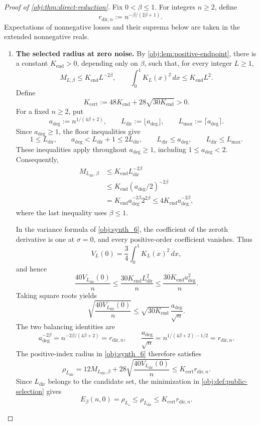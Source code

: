 \begin{proof}[Proof of \cref{obj:thm:direct-reduction}]
Fix \(0<\beta\le1\). For integers \(n\ge2\), define
\[
r_{\mathrm{dir},n}:=n^{-\beta/(2\beta+1)}.
\]
Expectations of nonnegative losses and their suprema below are taken in the extended nonnegative reals.

\begin{enumerate}
\item \textbf{The selected radius at zero noise.}
By \cref{obj:lem:positive-endpoint}, there is a constant \(K_{\mathrm{end}}>0\), depending only on \(\beta\), such that, for every integer \(L\ge1\),
\[
M_{L,\beta}\le K_{\mathrm{end}}L^{-2\beta},
\qquad
\int_0^1 K_L(x)^2\,dx\le K_{\mathrm{end}}L^2.
\]
Define
\[
K_{\mathrm{cert}}
:=48K_{\mathrm{end}}+28\sqrt{30K_{\mathrm{end}}}>0.
\]
For a fixed \(n\ge2\), put
\[
a_{\mathrm{deg}}:=n^{1/(4\beta+2)},
\qquad
L_{\mathrm{dir}}:=\lfloor a_{\mathrm{deg}}\rfloor,
\qquad
L_{\max}:=\lceil a_{\mathrm{deg}}\rceil.
\]
Since \(a_{\mathrm{deg}}\ge1\), the floor inequalities give
\[
1\le L_{\mathrm{dir}},
\qquad
a_{\mathrm{deg}}<L_{\mathrm{dir}}+1\le2L_{\mathrm{dir}},
\qquad
L_{\mathrm{dir}}\le a_{\mathrm{deg}},
\qquad
L_{\mathrm{dir}}\le L_{\max}.
\]
These inequalities apply throughout \(a_{\mathrm{deg}}\ge1\), including \(1\le a_{\mathrm{deg}}<2\). Consequently,
\[
\begin{aligned}
M_{L_{\mathrm{dir}},\beta}
&\le K_{\mathrm{end}}L_{\mathrm{dir}}^{-2\beta}\\
&\le K_{\mathrm{end}}(a_{\mathrm{deg}}/2)^{-2\beta}\\
&=K_{\mathrm{end}}a_{\mathrm{deg}}^{-2\beta}2^{2\beta}
\le4K_{\mathrm{end}}a_{\mathrm{deg}}^{-2\beta},
\end{aligned}
\]
where the last inequality uses \(\beta\le1\).

In the variance formula of \cref{obj:synth_6}, the coefficient of the zeroth derivative is one at \(\sigma=0\), and every positive-order coefficient vanishes. Thus
\[
V_L(0)=\frac34\int_0^1K_L(x)^2\,dx,
\]
and hence
\[
\frac{40V_{L_{\mathrm{dir}}}(0)}{n}
\le\frac{30K_{\mathrm{end}}L_{\mathrm{dir}}^2}{n}
\le\frac{30K_{\mathrm{end}}a_{\mathrm{deg}}^2}{n}.
\]
Taking square roots yields
\[
\sqrt{\frac{40V_{L_{\mathrm{dir}}}(0)}{n}}
\le\sqrt{30K_{\mathrm{end}}}\,
\frac{a_{\mathrm{deg}}}{\sqrt n}.
\]
The two balancing identities are
\[
a_{\mathrm{deg}}^{-2\beta}
=n^{-2\beta/(4\beta+2)}
=r_{\mathrm{dir},n},
\qquad
\frac{a_{\mathrm{deg}}}{\sqrt n}
=n^{1/(4\beta+2)-1/2}
=r_{\mathrm{dir},n}.
\]
The positive-index radius in \cref{obj:synth_6} therefore satisfies
\[
\rho_{L_{\mathrm{dir}}}
=12M_{L_{\mathrm{dir}},\beta}
+28\sqrt{\frac{40V_{L_{\mathrm{dir}}}(0)}{n}}
\le K_{\mathrm{cert}}r_{\mathrm{dir},n}.
\]
Since \(L_{\mathrm{dir}}\) belongs to the candidate set, the minimization in \cref{obj:def:public-selection} gives
\[
E_\beta(n,0)=\rho_{L_\star}
\le\rho_{L_{\mathrm{dir}}}
\le K_{\mathrm{cert}}r_{\mathrm{dir},n}.
\]


\end{enumerate}
\end{proof}
